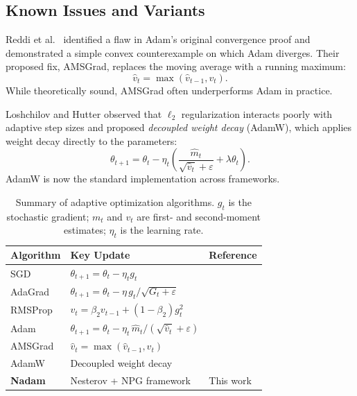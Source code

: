 \documentclass[11pt,twoside,openright]{book}
\begin{document}
\subsection{Known Issues and Variants}

Reddi et al.\ \cite{reddi2018} identified a flaw in Adam's original convergence proof and
demonstrated a simple convex counterexample on which Adam diverges. Their proposed fix,
AMSGrad, replaces the moving average with a running maximum:
\begin{equation}
  \hat{v}_t = \max(\hat{v}_{t-1}, v_t).
\end{equation}
While theoretically sound, AMSGrad often underperforms Adam in practice.

Loshchilov and Hutter \cite{loshchilov2019} observed that $\ell_2$ regularization interacts
poorly with adaptive step sizes and proposed \emph{decoupled weight decay} (AdamW), which
applies weight decay directly to the parameters:
\begin{equation}
  \theta_{t+1} = \theta_t - \eta_t\left(\frac{\hat{m}_t}{\sqrt{\hat{v}_t} + \varepsilon}
    + \lambda\theta_t\right).
\end{equation}
AdamW is now the standard implementation across frameworks.

\begin{table}[tb]
  \centering
  \caption{Summary of adaptive optimization algorithms. $g_t$ is the stochastic gradient;
    $m_t$ and $v_t$ are first- and second-moment estimates; $\eta_t$ is the learning rate.}
  \label{tab:algorithms}
  \begin{tabular}{@{}lll@{}}
    \toprule
    \textbf{Algorithm} & \textbf{Key Update} & \textbf{Reference}\\
    \midrule
    SGD           & $\theta_{t+1} = \theta_t - \eta_t g_t$ & \cite{robbins1951}\\
    AdaGrad       & $\theta_{t+1} = \theta_t - \eta\,g_t/\sqrt{G_t+\varepsilon}$ & \cite{duchi2011}\\
    RMSProp       & $v_t = \beta_2 v_{t-1} + (1-\beta_2)g_t^2$ & \cite{tieleman2012}\\
    Adam          & $\theta_{t+1} = \theta_t - \eta_t\,\hat{m}_t/(\sqrt{\hat{v}_t}+\varepsilon)$ & \cite{kingma2015}\\
    AMSGrad       & $\hat{v}_t = \max(\hat{v}_{t-1}, v_t)$ & \cite{reddi2018}\\
    AdamW         & Decoupled weight decay & \cite{loshchilov2019}\\
    \textbf{Nadam} & Nesterov + NPG framework & This work\\
    \bottomrule
  \end{tabular}
\end{table}
\end{document}
